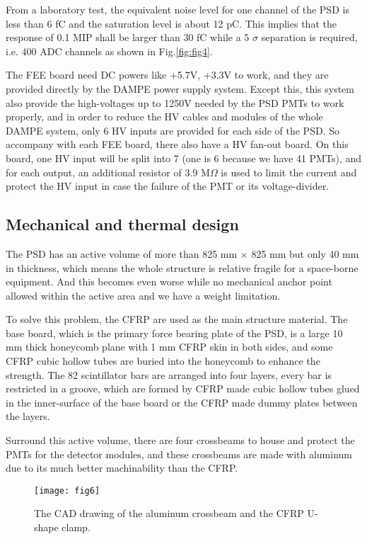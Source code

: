 \documentclass[preprint]{elsarticle}
\begin{document}
From a laboratory test, the equivalent noise level for one channel of the PSD is less than 6 fC and the saturation level is about 12 pC. This implies that the response of 0.1 MIP shall be larger than 30 fC while a 5 $\sigma$ separation is required, i.e. 400 ADC channels as shown in Fig.\ref{fig:fig4}.

The FEE board need DC powers like +5.7V, +3.3V to work, and they are provided directly by the DAMPE power supply system. Except this, this system also provide the high-voltages up to 1250V needed by the PSD PMTs to work properly, and in order to reduce the HV cables and modules of the whole DAMPE system, only 6 HV inputs are provided for each side of the PSD. So accompany with each FEE board, there also have a HV fan-out board. On this board, one HV input will be split into 7 (one is 6 because we have 41 PMTs), and for each output, an additional resistor of 3.9 M$\Omega$ is used to limit the current and protect the HV input in case the failure of the PMT or its voltage-divider.

\subsection{Mechanical and thermal design}

The PSD has an active volume of more than 825 mm $\times$ 825 mm but only 40 mm in thickness, which means the whole structure is relative fragile for a space-borne equipment. And this becomes even worse while no mechanical anchor point allowed within the active area and we have a weight limitation.

To solve this problem, the CFRP are used as the main structure material. The base board, which is the primary force bearing plate of the PSD, is a large  10 mm thick honeycomb plane with 1 mm CFRP skin in both sides, and some CFRP cubic hollow tubes are buried into the honeycomb to enhance the strength. The 82 scintillator bars are arranged into four layers, every bar is restricted in a groove, which are formed by CFRP made cubic hollow tubes glued in the inner-surface of the base board or the CFRP made dummy plates between the layers.

Surround this active volume, there are four crossbeams to house and protect the PMTs for the detector modules, and these crossbeams are made with aluminum due to its much better machinability than the CFRP.

\begin{figure}
 \centering
 \texttt{[image: fig6]}
\caption{The CAD drawing of the aluminum crossbeam and the CFRP U-shape clamp.}
\label{fig:fig6}
\end{figure}
\end{document}
